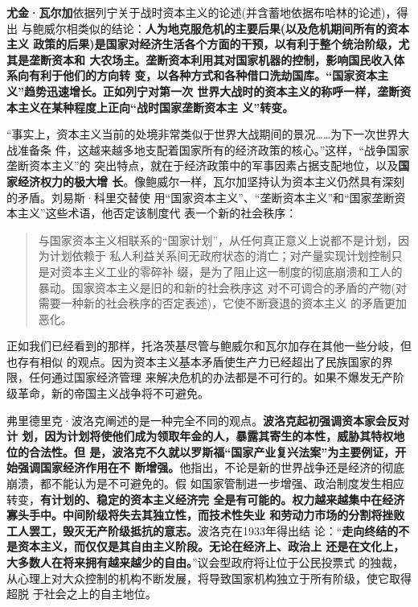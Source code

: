 \textbf{尤金·瓦尔加}依据列宁关于战时资本主义的论述(并含蓄地依据布哈林的论述)，得出
与鲍威尔相类似的结论：\textbf{人为地克服危机的主要后果(以及危机期间所有的资本主义
政策的后果)是国家对经济生活各个方面的干预，以有利于整个统治阶级，尤其是垄断资本和
大农场主。垄断资本利用其对国家机器的控制，影响国民收入体系向有利于他们的方向转
变，以各种方式和各种借口洗劫国库。“国家资本主义”趋势迅速增长。正如列宁对第一次
世界大战时的资本主义的称呼一样，垄断资本主义在某种程度上正向“战时国家垄断资本主
义”转变。}

“事实上，资本主义当前的处境非常类似于世界大战期间的景况……为下一次世界大战准备条
件，这越来越多地支配着国家所有的经济政策的核心。”这样，“战争国家垄断资本主义”的
突出特点，就在于经济政策中的军事因素占据支配地位，以及\textbf{国家经济权力的极大增
长}。像鲍威尔一样，瓦尔加坚持认为资本主义仍然具有深刻的矛盾。刘易斯·科里交替使
用“国家资本主义”、“垄断资本主义”和“国家垄断资本主义”这些术语，他否定该制度代
表一个新的社会秩序：
\begin{quotation}
与国家资本主义相联系的“国家计划”，从任何真正意义上说都不是计划，因为计划依赖于
私人利益关系间无政府状态的消亡；对产量实现计划控制只是对资本主义工业的零碎补
缀，是为了阻止这一制度的彻底崩溃和工人的暴动。国家资本主义是旧的和新的社会秩序这
对不可调合的矛盾的产物(对需要一种新的社会秩序的否定表述)，它使不断衰退的资本主义
的矛盾更加恶化。
\end{quotation}

正如我们已经看到的那样，托洛茨基尽管与鲍威尔和瓦尔加存在其他一些分岐，但也存有相似
的观点。因为资本主义基本矛盾使生产力已经超出了民族国家的界限，任何通过国家经济管理
来解决危机的办法都是不可行的。如果不爆发无产阶级革命，新的帝国主义战争将不可避免。


弗里德里克·波洛克阐述的是一种完全不同的观点。\textbf{波洛克起初强调资本家会反对计
划，因为计划将使他们成为领取年金的人，暴露其寄生的本性，威胁其特权地位的合法性。但
是，波洛克不久就以罗斯福“国家产业复兴法案”为主要例证，开始强调国家经济作用在不
断增强。}他指出，不论是新的世界战争还是经济的彻底崩溃，都不能认为是不可避免的。假
如国家管制进一步增强、政治制度发生相应转变，\textbf{有计划的、稳定的资本主义经济完
全是有可能的。权力越来越集中在经济寡头手中。中间阶级将失去其独立性，而技术性失业
和劳动力市场的分割将挫败工人罢工，毁灭无产阶级抵抗的意志。}波洛克在1933年得出结
论：“\textbf{走向终结的不是资本主义，而仅仅是其自由主义阶段。无论在经济上、政治上
还是在文化上，大多数人在将来拥有越来越少的自由。}”议会型政府将让位于公民投票式
的独裁，从心理上对大众控制的机构不断发展，将导致国家机构独立于所有阶级，使它取得超脱
于社会之上的自主地位。


